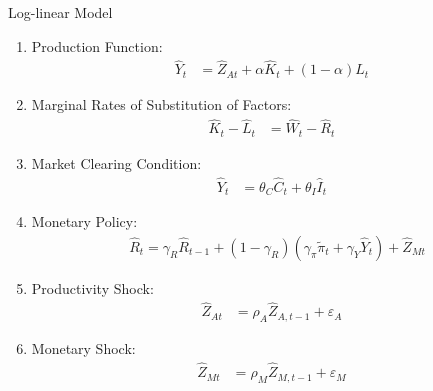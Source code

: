\documentclass[
presentation.tex
]{subfiles}
\begin{document}
\begin{frame}[allowframebreaks]{Log-linear Model}
\begin{enumerate}
		\item Production Function:
		\begin{align}
			\hat{Y}_t &= \hat{Z}_{At} + \alpha \hat{K}_t + (1-\alpha) \hat{L}_t %
		\end{align}
		
		
		\item Marginal Rates of Substitution of Factors:
		\begin{align}
			\hat{K}_t - \hat{L}_t &= \hat{W}_t - \hat{R}_t %
		\end{align}
		
		\item Market Clearing Condition:
		\begin{align}
			\hat{Y}_t &= \theta_C \hat{C}_t + \theta_I \hat{I}_t 
		\end{align}
		
		\item Monetary Policy:
		\begin{align}
			& \hat{R}_t = \gamma_R \hat{R}_{t-1} + (1-\gamma_R)(\gamma_\pi \widetilde{\pi}_t + \gamma_Y \hat{Y}_t) + \hat{Z}_{Mt} %
		\end{align}
		
		\item Productivity Shock:
		\begin{align}
			\hat{Z}_{At} &= \rho_A \hat{Z}_{A,t-1} + \varepsilon_{A} %
		\end{align}
		
		\item Monetary Shock:
		\begin{align}
			\hat{Z}_{Mt} &= \rho_M \hat{Z}_{M,t-1} + \varepsilon_{M} %
		\end{align}
		
	\end{enumerate}
	
\end{frame}
\end{document}

